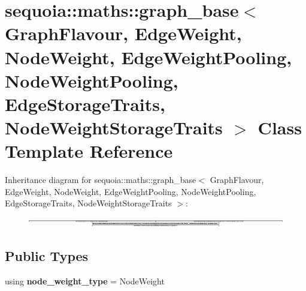\hypertarget{classsequoia_1_1maths_1_1graph__base}{}\section{sequoia\+::maths\+::graph\+\_\+base$<$ Graph\+Flavour, Edge\+Weight, Node\+Weight, Edge\+Weight\+Pooling, Node\+Weight\+Pooling, Edge\+Storage\+Traits, Node\+Weight\+Storage\+Traits $>$ Class Template Reference}
\label{classsequoia_1_1maths_1_1graph__base}
Inheritance diagram for sequoia\+::maths\+::graph\+\_\+base$<$ Graph\+Flavour, Edge\+Weight, Node\+Weight, Edge\+Weight\+Pooling, Node\+Weight\+Pooling, Edge\+Storage\+Traits, Node\+Weight\+Storage\+Traits $>$\+:\begin{figure}[H]
\begin{center}
\leavevmode
\includegraphics[height=0.321101cm]{classsequoia_1_1maths_1_1graph__base}
\end{center}
\end{figure}
\subsection*{Public Types}
\begin{DoxyCompactItemize}
\item 
\mbox{\label{classsequoia_1_1maths_1_1graph__base_a470bbb821a875ccdca34b2438ddc2dcb}} 
using {\bfseries node\+\_\+weight\+\_\+type} = Node\+Weight
\end{DoxyCompactItemize}
